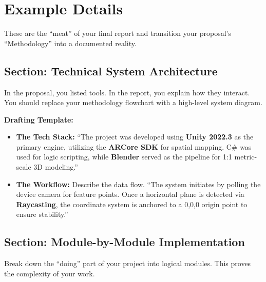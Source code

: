 \documentclass{tietreport}
\begin{document}
\section{Example Details}

These are the ``meat'' of your final report and
transition your proposal's ``Methodology'' into a
documented reality.

\subsection{Section: Technical System
  Architecture}

In the proposal, you listed tools. In the report, you
explain how they interact. You should replace your
methodology flowchart with a high-level system diagram.

\textbf{Drafting Template:}

\begin{itemize}
\item \textbf{The Tech Stack:} ``The project was
  developed using \textbf{Unity 2022.3} as the primary
  engine, utilizing the \textbf{ARCore SDK} for spatial
  mapping.  C\# was used for logic scripting, while
  \textbf{Blender} served as the pipeline for 1:1
  metric-scale 3D modeling.''
\item \textbf{The Workflow:} Describe the data
  flow. ``The system initiates by polling the device
  camera for feature points. Once a horizontal plane is
  detected via \textbf{Raycasting}, the coordinate
  system is anchored to a 0,0,0 origin point to ensure
  stability.''
\end{itemize}

\subsection{Section: Module-by-Module Implementation}

Break down the ``doing'' part of your project into
logical modules. This proves the complexity of your
work.
\end{document}
